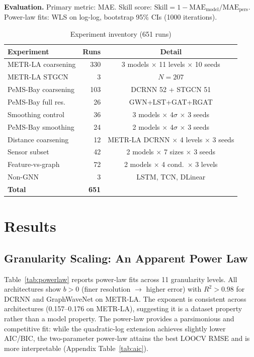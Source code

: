 \documentclass[sigconf]{acmart}
\begin{document}
\textbf{Evaluation.} Primary metric: MAE. Skill score: $\text{Skill} = 1 - \text{MAE}_\text{model}/\text{MAE}_\text{pers}$. Power-law fits: WLS on log-log, bootstrap 95\% CIs (1000 iterations).

\begin{table}[t]
\small
\centering
\caption{Experiment inventory (651 runs)}
\label{tab:inventory}
\begin{tabular}{@{}lrc@{}}
\toprule
Experiment & Runs & Detail \\
\midrule
METR-LA coarsening  & 330 & 3 models $\times$ 11 levels $\times$ 10 seeds \\
METR-LA STGCN       &   3 & $N{=}207$ \\
PeMS-Bay coarsening & 103 & DCRNN 52 + STGCN 51 \\
PeMS-Bay full res.\ &  26 & GWN+LST+GAT+RGAT \\
Smoothing control   &  36 & 3 models $\times$ 4$\sigma$ $\times$ 3 seeds \\
PeMS-Bay smoothing  &  24 & 2 models $\times$ 4$\sigma$ $\times$ 3 seeds \\
Distance coarsening &  12 & METR-LA DCRNN $\times$ 4 levels $\times$ 3 seeds \\
Sensor subset       &  42 & 2 models $\times$ 7 sizes $\times$ 3 seeds \\
Feature-vs-graph    &  72 & 2 models $\times$ 4 cond.\ $\times$ 3 levels \\
Non-GNN            &   3 & LSTM, TCN, DLinear \\
\midrule
\textbf{Total}     & \textbf{651} & \\
\bottomrule
\end{tabular}
\end{table}

\section{Results}

\subsection{Granularity Scaling: An Apparent Power Law}

Table~\ref{tab:powerlaw} reports power-law fits across 11 granularity levels. All architectures show $b > 0$ (finer resolution $\to$ higher error) with $R^2 > 0.98$ for DCRNN and GraphWaveNet on METR-LA. The exponent is consistent across architectures (0.157--0.176 on METR-LA), suggesting it is a dataset property rather than a model property. The power-law provides a parsimonious and competitive fit: while the quadratic-log extension achieves slightly lower AIC/BIC, the two-parameter power-law attains the best LOOCV RMSE and is more interpretable (Appendix Table~\ref{tab:aic}).
\end{document}
